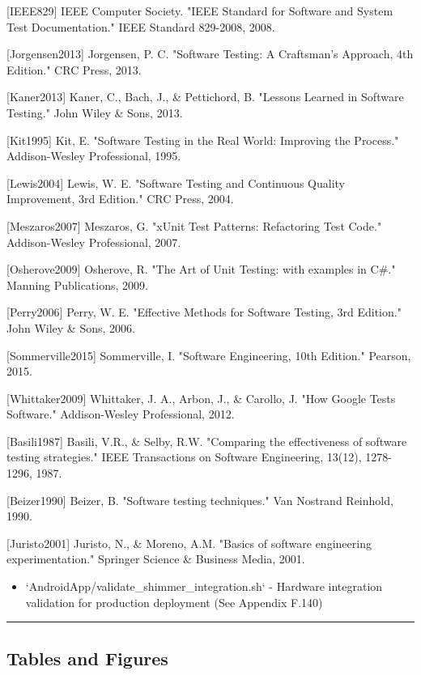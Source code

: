 \documentclass[12pt,a4paper]{article}
\begin{document}
[IEEE829] IEEE Computer Society. "IEEE Standard for Software and System Test Documentation." IEEE Standard 829-2008,
2008.

[Jorgensen2013] Jorgensen, P. C. "Software Testing: A Craftsman's Approach, 4th Edition." CRC Press, 2013.

[Kaner2013] Kaner, C., Bach, J., \& Pettichord, B. "Lessons Learned in Software Testing." John Wiley \& Sons, 2013.

[Kit1995] Kit, E. "Software Testing in the Real World: Improving the Process." Addison-Wesley Professional, 1995.

[Lewis2004] Lewis, W. E. "Software Testing and Continuous Quality Improvement, 3rd Edition." CRC Press, 2004.

[Meszaros2007] Meszaros, G. "xUnit Test Patterns: Refactoring Test Code." Addison-Wesley Professional, 2007.

[Osherove2009] Osherove, R. "The Art of Unit Testing: with examples in C\#." Manning Publications, 2009.

[Perry2006] Perry, W. E. "Effective Methods for Software Testing, 3rd Edition." John Wiley \& Sons, 2006.

[Sommerville2015] Sommerville, I. "Software Engineering, 10th Edition." Pearson, 2015.

[Whittaker2009] Whittaker, J. A., Arbon, J., \& Carollo, J. "How Google Tests Software." Addison-Wesley Professional,
2012.

[Basili1987] Basili, V.R., \& Selby, R.W. "Comparing the effectiveness of software testing strategies." IEEE Transactions
on Software Engineering, 13(12), 1278-1296, 1987.

[Beizer1990] Beizer, B. "Software testing techniques." Van Nostrand Reinhold, 1990.

[Juristo2001] Juristo, N., \& Moreno, A.M. "Basics of software engineering experimentation." Springer Science \& Business
Media, 2001.

\begin{itemize}
\item `AndroidApp/validate_shimmer_integration.sh` - Hardware integration validation for production deployment (See Appendix
  F.140)

\end{itemize}
\hrule

\subsection{Tables and Figures}
\end{document}
